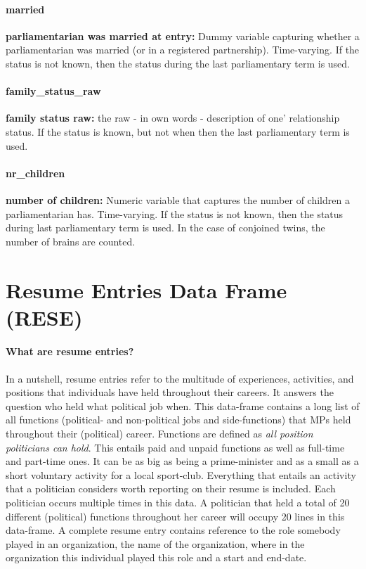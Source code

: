 \documentclass{article}
\begin{document}
\paragraph{married}
    \textbf{parliamentarian was married at entry:} Dummy variable capturing whether a parliamentarian was married (or in a registered partnership). Time-varying. If the status is not known, then the status during the last parliamentary term is used. 
    
    
\paragraph{family\_status\_raw}
    \textbf{family status raw:} the raw - in own words - description of one' relationship status. If the status is known, but not when then the last parliamentary term is used. 
    
\paragraph{nr\_children}
    \textbf{number of children:} Numeric variable that captures the number of children a parliamentarian has. Time-varying.  If the status is not known, then the status during last parliamentary term is used. 
    In the case of conjoined twins, the number of brains are counted. 


\section{Resume Entries Data Frame (\gls{RESE})}\label{RESE}

    \paragraph{What are resume entries?} In a nutshell, resume entries refer to the multitude of experiences, activities, and positions that individuals have held throughout their careers. It answers the question who held what political job when. This data-frame contains a long list of all functions (political- and non-political jobs and side-functions) that MPs held throughout their (political) career. Functions are defined as \textit{all position politicians can hold}. This entails paid and unpaid functions as well as full-time and part-time ones. It can be as big as being a prime-minister and as a small as a short voluntary activity for a local sport-club. Everything that entails an activity that a politician considers worth reporting on their resume is included. Each politician occurs multiple times in this data. A politician that held a total of 20 different (political) functions throughout her career will occupy 20 lines in this data-frame. A complete resume entry contains reference to the role somebody played in an organization, the name of the organization, where in the organization this individual played this role and a start and end-date. 
    
\end{document}
